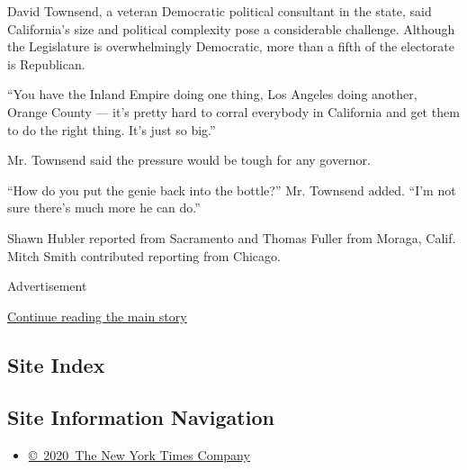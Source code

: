 David Townsend, a veteran Democratic political consultant in the state,
said California's size and political complexity pose a considerable
challenge. Although the Legislature is overwhelmingly Democratic, more
than a fifth of the electorate is Republican.

``You have the Inland Empire doing one thing, Los Angeles doing another,
Orange County --- it's pretty hard to corral everybody in California and
get them to do the right thing. It's just so big.''

Mr. Townsend said the pressure would be tough for any governor.

``How do you put the genie back into the bottle?'' Mr. Townsend added.
``I'm not sure there's much more he can do.''

Shawn Hubler reported from Sacramento and Thomas Fuller from Moraga,
Calif. Mitch Smith contributed reporting from Chicago.

Advertisement

\protect\hyperlink{after-bottom}{Continue reading the main story}

\hypertarget{site-index}{%
\subsection{Site Index}\label{site-index}}

\hypertarget{site-information-navigation}{%
\subsection{Site Information
Navigation}\label{site-information-navigation}}

\begin{itemize}
\tightlist
\item
  \href{https://help.nytimes3xbfgragh.onion/hc/en-us/articles/115014792127-Copyright-notice}{©~2020~The
  New York Times Company}
\end{itemize}

